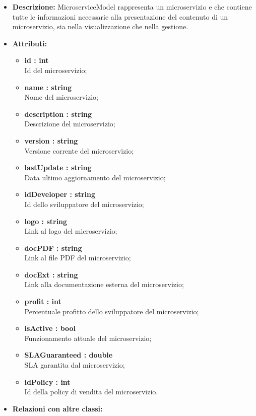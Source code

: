 \begin{itemize}
	\item \textbf{Descrizione:} MicroserviceModel rappresenta un microservizio e che contiene tutte le
informazioni necessarie alla presentazione del contenuto di un microservizio, sia nella visualizzazione che nella gestione.
	\item \textbf{Attributi:}
		\begin{itemize}
			\item \textbf{id : int}\\
			Id del microservizio;
			\item \textbf{name : string}\\
			Nome del microservizio;
			\item \textbf{description : string}\\
			Descrizione del microservizio;
			\item \textbf{version : string}\\
			Versione corrente del microservizio;
			\item \textbf{lastUpdate : string}\\
			Data ultimo aggiornamento del microservizio;
			\item \textbf{idDeveloper : string}\\
			Id dello sviluppatore del microservizio;
			\item \textbf{logo : string}\\
			Link al logo del microservizio;
			\item \textbf{docPDF : string}\\
			Link al file PDF del microservizio;
			\item \textbf{docExt : string}\\
			Link alla documentazione esterna del microservizio;
			\item \textbf{profit : int}\\
			Percentuale profitto dello sviluppatore del microservizio;
			\item \textbf{isActive : bool}\\
			Funzionamento attuale del microservizio;
			\item \textbf{SLAGuaranteed : double}\\
			SLA garantita dal microservizio;
			\item \textbf{idPolicy : int}\\
			Id della policy di vendita del microservizio.
		\end{itemize}
	\item \textbf{Relazioni con altre classi:}

\end{itemize}
